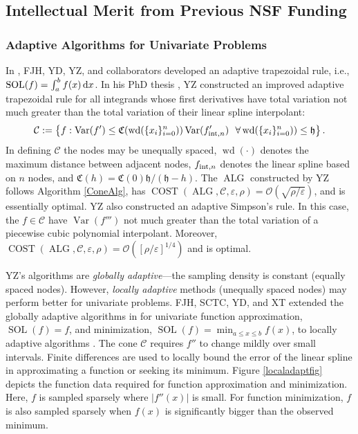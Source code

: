 \documentclass[11pt]{NSFamsart}
\DeclareMathOperator{\cost}{COST}
\DeclareMathOperator{\size}{wd}
\newcommand{\hcut}{\mathfrak{h}}
\DeclareMathOperator{\Var}{Var}
\DeclareMathOperator{\SOL}{SOL}
\DeclareMathOperator{\ALG}{ALG}
\def\dif{\textup{d}}
\newcommand{\cc}{\mathcal{C}}
\newcommand{\fC}{\mathfrak{C}}
\newcommand{\Order}{\mathcal{O}}
\newcommand{\inflate}{\fC}
\begin{document}
\subsection{Intellectual Merit from Previous NSF Funding}
\label{previousmeritsubsec}

\subsubsection{Adaptive Algorithms for Univariate Problems} \label{sec:localadpat}
In \cite{HicEtal14b}, FJH, YD, YZ, and collaborators developed an adaptive trapezoidal rule, i.e., $\SOL(f) = \int_a^b f(x) \, \dif x$.  In his PhD thesis \cite{Zha18a}, YZ constructed an improved adaptive trapezoidal rule for all integrands whose first derivatives have total variation not much greater than the total variation of their linear spline interpolant:
\[
\cc: = \left \{ f : \Var(f') \le \inflate(\size(\{x_i\}_{i=0}^n)) \Var(f'_{\textup{int},n}) \ \ \forall \size(\{x_i\}_{i=0}^n)) \le \hcut \right\}.
\]
In defining $\cc$ the nodes may be unequally spaced, $\size(\cdot)$ denotes the maximum distance between adjacent nodes, $f_{\textup{int},n}$ denotes the linear spline based on $n$ nodes, and $\inflate(h) = \inflate(0) \hcut/(\hcut - h)$.  The $\ALG$ constructed by YZ follows Algorithm \ref{ConeAlg}, has  $\cost(\ALG,\cc,\varepsilon, \rho) =  \Order(\sqrt{\rho/\varepsilon})$, and is essentially optimal.  YZ also constructed an adaptive Simpson's rule.  In this case, the $f \in \cc$ have $\Var(f''')$ not much greater than the total variation of a piecewise cubic polynomial interpolant.  Moreover,  $\cost(\ALG,\cc,\varepsilon, \rho) =  \Order([\rho/\varepsilon]^{1/4})$ and is optimal.  

YZ's algorithms are \emph{globally adaptive}---the sampling density is constant (equally spaced nodes).  However, \emph{locally adaptive} methods (unequally spaced nodes) may perform better for univariate problems.  FJH, SCTC, YD, and XT extended the globally adaptive algorithms in \cite{HicEtal14b,Ton14a} for univariate function approximation, $\SOL(f) = f$, and minimization, $\SOL(f) = \min_{a \le x \le b} f(x)$, to locally adaptive algorithms \cite{ChoEtal17a}.  The cone $\cc$ requires $f''$ to change mildly over small intervals.  Finite differences are used to locally bound the error of the linear spline in approximating a function or seeking its minimum. Figure 
\ref{localadaptfig} depicts the function data required for function approximation and minimization.  Here, $f$ is 
sampled sparsely where $|f''(x)|$ is small. For function minimization, $f$ is also sampled sparsely when $f(x)$ is significantly bigger than the observed minimum.
\end{document}
